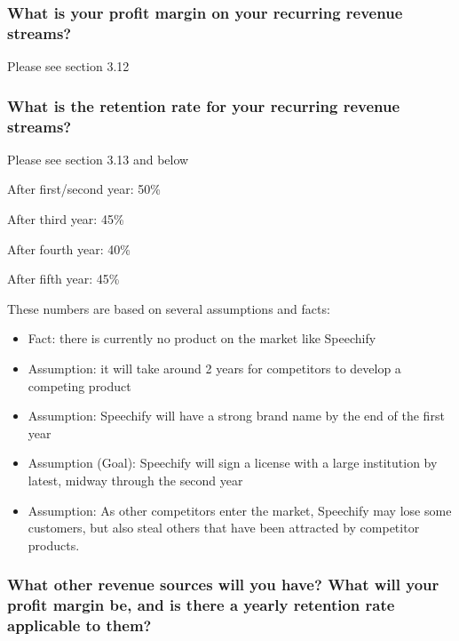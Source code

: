 \documentclass{article}
\begin{document}
        \subsubsection{What is your profit margin on your recurring revenue streams?}

        Please see section 3.12

        \subsubsection{What is the retention rate for your recurring revenue streams?}
        
        Please see section 3.13 and below
        \begin{itemize}
            \begin{multicols}{2}
                \item After first/second year: 50\%
                \item After third year: 45\%
                \item After fourth year: 40\%
                \item After fifth year: 45\%
            \end{multicols}
        \end{itemize}
        These numbers are based on several assumptions and facts:
        \begin{itemize}
            \item Fact: there is currently no product on the market like Speechify
            \item Assumption: it will take around 2 years for competitors to develop a competing product
            \item Assumption: Speechify will have a strong brand name by the end of the first year
            \item Assumption (Goal): Speechify will sign a license with a large institution by latest, midway through the second year
            \item Assumption: As other competitors enter the market, Speechify may lose some customers, but also steal others that have been attracted by competitor products.
        \end{itemize} 

        \subsubsection{What other revenue sources will you have? What will your profit margin be, and is there a yearly retention rate applicable to them?}
\end{document}

